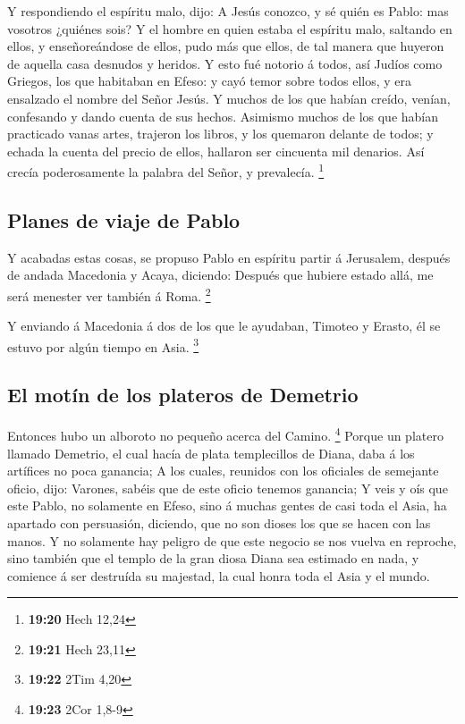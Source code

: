  Y respondiendo el espíritu malo, dijo: A Jesús conozco, y
sé quién es Pablo: mas vosotros ¿quiénes sois?  Y el hombre
en quien estaba el espíritu malo, saltando en ellos, y enseñoreándose de
ellos, pudo más que ellos, de tal manera que huyeron de aquella casa
desnudos y heridos.  Y esto fué notorio á todos, así Judíos
como Griegos, los que habitaban en Efeso: y cayó temor sobre todos
ellos, y era ensalzado el nombre del Señor Jesús.  Y muchos
de los que habían creído, venían, confesando y dando cuenta de sus
hechos.  Asimismo muchos de los que habían practicado vanas
artes, trajeron los libros, y los quemaron delante de todos; y echada la
cuenta del precio de ellos, hallaron ser cincuenta mil denarios.
 Así crecía poderosamente la palabra del Señor, y
prevalecía. \footnote{\textbf{19:20} Hech 12,24}

\hypertarget{planes-de-viaje-de-pablo}{%
\subsection{Planes de viaje de Pablo}\label{planes-de-viaje-de-pablo}}

 Y acabadas estas cosas, se propuso Pablo en espíritu
partir á Jerusalem, después de andada Macedonia y Acaya, diciendo:
Después que hubiere estado allá, me será menester ver también á Roma.
\footnote{\textbf{19:21} Hech 23,11}

 Y enviando á Macedonia á dos de los que le ayudaban,
Timoteo y Erasto, él se estuvo por algún tiempo en Asia. \footnote{\textbf{19:22}
  2Tim 4,20}

\hypertarget{el-motuxedn-de-los-plateros-de-demetrio}{%
\subsection{El motín de los plateros de
Demetrio}\label{el-motuxedn-de-los-plateros-de-demetrio}}

 Entonces hubo un alboroto no pequeño acerca del Camino.
\footnote{\textbf{19:23} 2Cor 1,8-9}  Porque un platero
llamado Demetrio, el cual hacía de plata templecillos de Diana, daba á
los artífices no poca ganancia;  A los cuales, reunidos con
los oficiales de semejante oficio, dijo: Varones, sabéis que de este
oficio tenemos ganancia;  Y veis y oís que este Pablo, no
solamente en Efeso, sino á muchas gentes de casi toda el Asia, ha
apartado con persuasión, diciendo, que no son dioses los que se hacen
con las manos.  Y no solamente hay peligro de que este
negocio se nos vuelva en reproche, sino también que el templo de la gran
diosa Diana sea estimado en nada, y comience á ser destruída su
majestad, la cual honra toda el Asia y el mundo.

